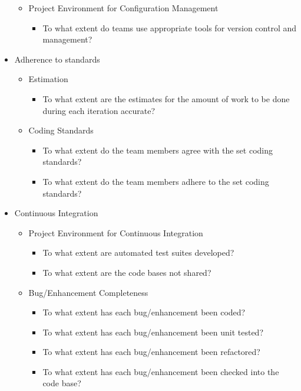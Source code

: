 \begin{appendices}
\begin{itemize}
\begin{itemize}
			\item Project Environment for Configuration Management
				\begin{itemize}
					\item To what extent do teams use appropriate tools for version control and management?
				\end{itemize}
		\end{itemize}
	\item Adherence to standards
		\begin{itemize}
			\item Estimation
				\begin{itemize}
					\item To what extent are the estimates for the amount of work to be done during each iteration accurate?
				\end{itemize}
			\item Coding Standards
				\begin{itemize}
					\item To what extent do the team members agree with the set coding standards? 
					\item To what extent do the team members adhere to the set coding standards?
				\end{itemize}
		\end{itemize}
	\item Continuous Integration
		\begin{itemize}
			\item Project Environment for Continuous Integration 
				\begin{itemize}
					\item To what extent are automated test suites developed?
					\item To what extent are the code bases not shared?
				\end{itemize}
			\item Bug/Enhancement Completeness
				\begin{itemize}
					\item To what extent has each bug/enhancement been coded? 
					\item To what extent has each bug/enhancement been unit tested? 
					\item To what extent has each bug/enhancement been refactored? 
					\item To what extent has each bug/enhancement been checked into the code base? 

\end{itemize}
\end{itemize}
\end{itemize}
\end{appendices}
